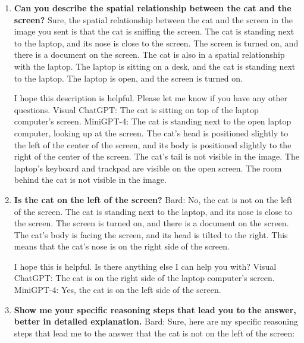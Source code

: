     \begin{enumerate}
        \item \textbf{Can you describe the spatial relationship between the cat and the screen?}
        \subitem 
        Sure, the spatial relationship between the cat and the screen in the image you sent is that the cat is sniffing the screen. The cat is standing next to the laptop, and its nose is close to the screen. The screen is turned on, and there is a document on the screen.
        The cat is also in a spatial relationship with the laptop. The laptop is sitting on a desk, and the cat is standing next to the laptop. The laptop is open, and the screen is turned on.

        I hope this description is helpful. Please let me know if you have any other questions.
        \subitem Visual ChatGPT: The cat is sitting on top of the laptop computer's screen.
        \subitem MiniGPT-4: The cat is standing next to the open laptop computer, looking up at the screen. The cat’s head is positioned slightly to the left of the center of the screen, and its body is positioned slightly to the right of the center of the screen. The cat’s tail is not visible in the image. The laptop’s keyboard and trackpad are visible on the open screen. The room behind the cat is not visible in the image.
        \item \textbf{Is the cat on the left of the screen?}
        \subitem Bard: 
        No, the cat is not on the left of the screen. The cat is standing next to the laptop, and its nose is close to the screen. The screen is turned on, and there is a document on the screen. The cat's body is facing the screen, and its head is tilted to the right. This means that the cat's nose is on the right side of the screen.
        
        I hope this is helpful. Is there anything else I can help you with?
        \subitem Visual ChatGPT: The cat is on the right side of the laptop computer's screen.
        \subitem MiniGPT-4: Yes, the cat is on the left side of the screen.
        \item \textbf{Show me your specific reasoning steps that lead you to the answer, better in detailed explanation.}
        \subitem Bard:
        Sure, here are my specific reasoning steps that lead me to the answer that the cat is not on the left of the screen:
        

\end{enumerate}
